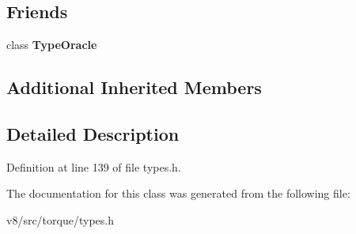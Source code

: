 \subsection*{Friends}
\begin{DoxyCompactItemize}
\item 
\mbox{\label{classv8_1_1internal_1_1torque_1_1TopType_a7094142f1d9b95b74797a11decbf23e3}} 
class {\bfseries Type\+Oracle}
\end{DoxyCompactItemize}
\subsection*{Additional Inherited Members}


\subsection{Detailed Description}


Definition at line 139 of file types.\+h.



The documentation for this class was generated from the following file\+:\begin{DoxyCompactItemize}
\item 
v8/src/torque/types.\+h\end{DoxyCompactItemize}
